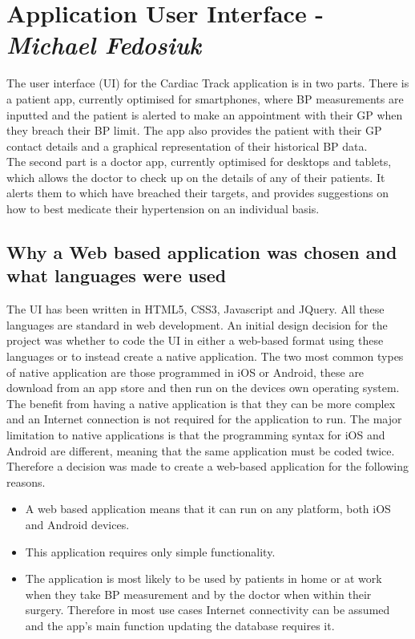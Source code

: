 \documentclass[11pt]{article}
\begin{document}
\section{Application User Interface - \textit{Michael Fedosiuk}}
The user interface (UI) for the Cardiac Track application is in two parts. There is a patient app, currently optimised for smartphones, where BP measurements are inputted and the patient is alerted to make an appointment with their GP when they breach their BP limit. The app also provides the patient with their GP contact details and a graphical representation of their historical BP data.
\\ \indent
The second part is a doctor app, currently optimised for desktops and tablets, which allows the doctor to check up on the details of any of their patients. It alerts them to which have breached their targets, and provides suggestions on how to best medicate their hypertension on an individual basis. 

\subsection{Why a Web based application was chosen and what languages were used}
The UI has been written in HTML5, CSS3, Javascript and JQuery. All these languages are standard in web development. An initial design decision for the project was whether to code the UI in either a web-based format using these languages or to instead create a native application. The two most common types of native application are those programmed in iOS or Android, these are download from an app store and then run on the devices own operating system. The benefit from having a native application is that they can be more complex and an Internet connection is not required for the application to run. The major limitation to native applications is that the programming syntax for iOS and Android are different, meaning that the same application must be coded twice. Therefore a decision was made to create a web-based application for the following reasons.
\begin{itemize}
\item 
A web based application means that it can run on any platform, both iOS and Android devices.
\item
This application requires only simple functionality.
\item
The application is most likely to be used by patients in home or at work when they take BP measurement and by the doctor when within their surgery. Therefore in most use cases Internet connectivity can be assumed and the app's main function updating the database requires it.
\end{itemize}
\end{document}
